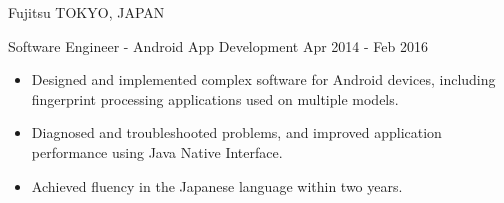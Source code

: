 \documentclass[10pt,a4paper]{article}
\begin{document}
\headedsection
{Fujitsu}
{\textsc{TOKYO, JAPAN}}
{
  \headedsubsection
  {Software Engineer - Android App Development}
  {Apr 2014 - Feb 2016}
  {
    \begin{itemize}
      \item Designed and implemented complex software for Android devices, including fingerprint processing applications used on multiple models.
      \item Diagnosed and troubleshooted problems, and improved application performance using Java Native Interface.
      \item Achieved fluency in the Japanese language within two years.

    \end{itemize}
  }
}
\end{document}

